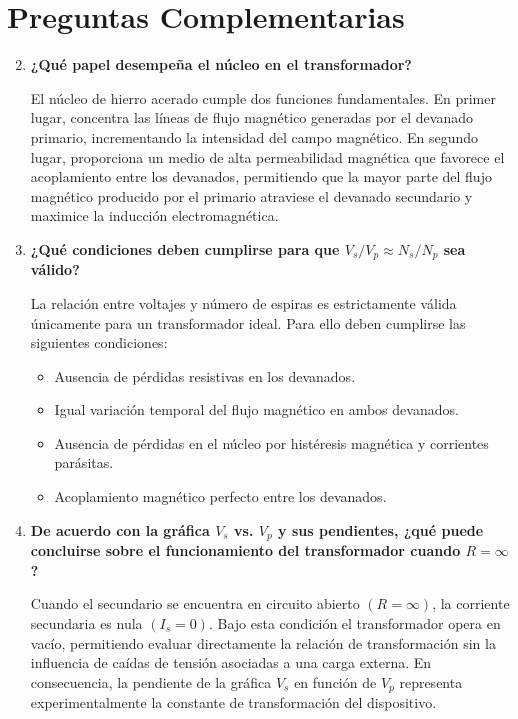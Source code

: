 \section{Preguntas Complementarias}

\begin{enumerate}
\setcounter{enumi}{1}

\item \textbf{¿Qué papel desempeña el núcleo en el transformador?}

El núcleo de hierro acerado cumple dos funciones fundamentales. En primer lugar, concentra las líneas de flujo magnético generadas por el devanado primario, incrementando la intensidad del campo magnético. En segundo lugar, proporciona un medio de alta permeabilidad magnética que favorece el acoplamiento entre los devanados, permitiendo que la mayor parte del flujo magnético producido por el primario atraviese el devanado secundario y maximice la inducción electromagnética.

\item \textbf{¿Qué condiciones deben cumplirse para que $V_s/V_p \approx N_s/N_p$ sea válido?}

La relación entre voltajes y número de espiras es estrictamente válida únicamente para un transformador ideal. Para ello deben cumplirse las siguientes condiciones:

\begin{itemize}
    \item Ausencia de pérdidas resistivas en los devanados.
    \item Igual variación temporal del flujo magnético en ambos devanados.
    \item Ausencia de pérdidas en el núcleo por histéresis magnética y corrientes parásitas.
    \item Acoplamiento magnético perfecto entre los devanados.
\end{itemize}

\item \textbf{De acuerdo con la gráfica $V_s$ vs. $V_p$ y sus pendientes, ¿qué puede concluirse sobre el funcionamiento del transformador cuando $R=\infty$?}

Cuando el secundario se encuentra en circuito abierto $(R=\infty)$, la corriente secundaria es nula $(I_s=0)$. Bajo esta condición el transformador opera en vacío, permitiendo evaluar directamente la relación de transformación sin la influencia de caídas de tensión asociadas a una carga externa. En consecuencia, la pendiente de la gráfica $V_s$ en función de $V_p$ representa experimentalmente la constante de transformación del dispositivo.


\end{enumerate}

